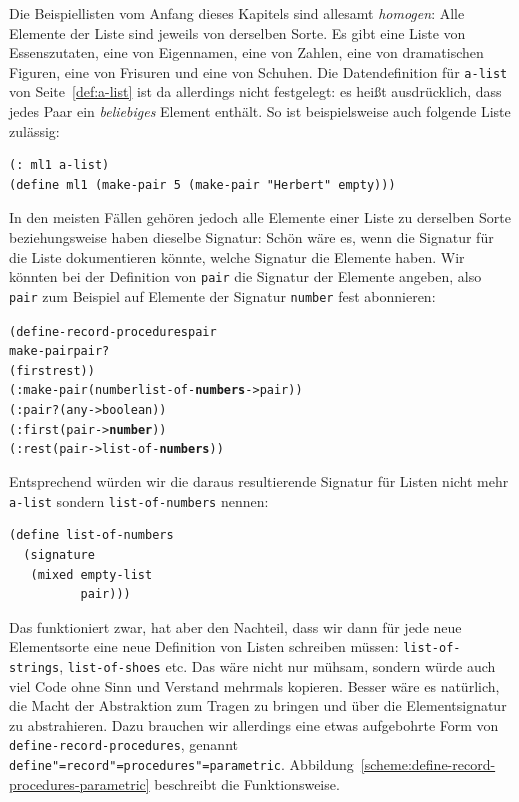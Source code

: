 Die Beispiellisten vom Anfang dieses Kapitels sind allesamt
\textit{homogen}: Alle Elemente der Liste sind jeweils
von derselben Sorte.  Es gibt eine Liste von Essenszutaten, eine von
Eigennamen, eine von Zahlen, eine von dramatischen Figuren, eine von
Frisuren und eine von Schuhen.  Die Datendefinition für
\texttt{a-list} von Seite~\ref{def:a-list} ist da allerdings nicht
festgelegt: es heißt ausdrücklich, dass jedes Paar ein
\emph{beliebiges} Element enthält.  So ist beispielsweise auch
folgende Liste zulässig:
%
\begin{verbatim}
(: ml1 a-list)
(define ml1 (make-pair 5 (make-pair "Herbert" empty)))
\end{verbatim}
%
In den meisten Fällen gehören jedoch alle Elemente einer Liste zu
derselben Sorte beziehungsweise haben dieselbe Signatur: Schön wäre
es, wenn die Signatur für die Liste dokumentieren könnte, welche
Signatur die Elemente haben.  Wir könnten bei
der Definition von \texttt{pair} die Signatur der Elemente angeben,
also \texttt{pair} zum Beispiel auf Elemente der Signatur
\texttt{number} fest abonnieren: 
%
\begin{alltt}
(define-record-procedures pair
  make-pair pair?
  (first rest))
(: make-pair (number list-of-\textbf{numbers} -> pair))
(: pair? (any -> boolean))
(: first (pair -> \textbf{number}))
(: rest (pair -> list-of-\textbf{numbers}))
\end{alltt}
%
Entsprechend würden wir die daraus resultierende Signatur für Listen
nicht mehr \texttt{a-list} sondern \texttt{list-of-numbers} nennen:
%
\begin{verbatim}
(define list-of-numbers
  (signature
   (mixed empty-list
          pair)))
\end{verbatim}
%
Das funktioniert zwar, hat aber den Nachteil, dass wir dann für jede
neue Elementsorte eine neue Definition von Listen schreiben müssen:
\texttt{list-of-strings}, \texttt{list-of-shoes} etc.  Das wäre nicht
nur mühsam, sondern würde auch viel Code ohne Sinn und Verstand
mehrmals kopieren.  Besser wäre es natürlich, die Macht der
Abstraktion zum Tragen zu bringen und über die Elementsignatur zu
abstrahieren.  Dazu brauchen wir allerdings eine etwas aufgebohrte
Form von \texttt{define-record-procedures}, genannt
\texttt{define"=record"=procedures"=parametric}.
Abbildung~\ref{scheme:define-record-procedures-parametric} beschreibt
die Funktionsweise.

